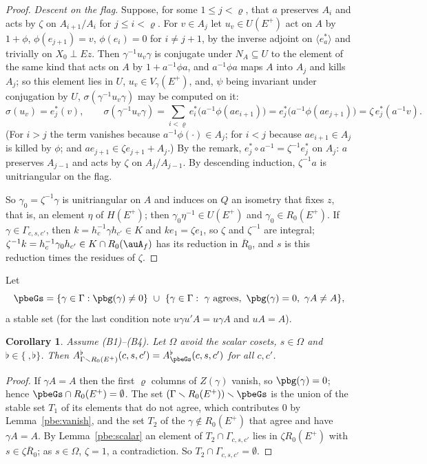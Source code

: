 \documentclass[10pt]{amsart}
\newtheorem{corollary}[theorem]{Corollary}
\theoremstyle{definition}
\theoremstyle{remark}
\providecommand{\pbR}{\overline R_0}
\begin{document}
\begin{proof}
\emph{Descent on the flag.} Suppose, for some $1\le j<\varrho$, that $a$ preserves $A_i$ and acts
by $\zeta$ on $A_{i+1}/A_i$ for $j\le i<\varrho$. For $v\in A_j$ let $u_v\in U(E^+)$ act on $A$ by
$1+\phi$, $\phi(e_{j+1})=v$, $\phi(e_i)=0$ for $i\ne j+1$, by the inverse adjoint on $\langle
e_a^*\rangle$ and trivially on $X_0\perp Ez$. Then $\gamma^{-1}u_v\gamma$ is conjugate under $N_A
\subseteq U$ to the element of the same kind that acts on $A$ by $1+a^{-1}\phi a$, and $a^{-1}\phi a$
maps $A$ into $A_j$ and kills $A_j$; so this element lies in $U$, $u_v\in V_\gamma(E^+)$, and, $\psi$
being invariant under conjugation by $U$, $\sigma(\gamma^{-1}u_v\gamma)$ may be computed on it:
\[
\sigma(u_v)=e_j^*(v),\qquad\sigma(\gamma^{-1}u_v\gamma)=\sum_{i<\varrho}e_i^*\bigl(a^{-1}\phi(ae_{i+1})
\bigr)=e_j^*\bigl(a^{-1}\phi(ae_{j+1})\bigr)=\zeta\,e_j^*(a^{-1}v).
\]
(For $i>j$ the term vanishes because $a^{-1}\phi(\cdot)\in A_j$; for $i<j$ because $ae_{i+1}\in A_j$
is killed by $\phi$; and $ae_{j+1}\in\zeta e_{j+1}+A_j$.) By the remark, $e_j^*\circ a^{-1}=\zeta^{-1}
e_j^*$ on $A_j$: $a$ preserves $A_{j-1}$ and acts by $\zeta$ on $A_j/A_{j-1}$. By descending
induction, $\zeta^{-1}a$ is unitriangular on the flag.

So $\gamma_0=\zeta^{-1}\gamma$ is unitriangular on $A$ and induces on $Q$ an isometry that fixes
$z$, that is, an element $\eta$ of $H(E^+)$; then $\gamma_0\eta^{-1}\in U(E^+)$ and $\gamma_0\in
R_0(E^+)$. If $\gamma\in\Gamma_{c,s,c'}$, then $k=h_c^{-1}\gamma h_{c'}\in K$ and $ke_1=\zeta e_1$, so
$\zeta$ and $\zeta^{-1}$ are integral; $\zeta^{-1}k=h_c^{-1}\gamma_0h_{c'}\in K\cap R_0(\auA_f)$ has
its reduction in $\pbR$, and $s$ is this reduction times the residues of $\zeta$.
\end{proof}

Let
\[
\pbeGs=\{\gamma\in\Gamma:\pbg(\gamma)\ne0\}\ \cup\ \{\gamma\in\Gamma:\ \gamma\text{ agrees},\ \pbg(
\gamma)=0,\ \gamma A\ne A\},
\]
a stable set (for the last condition note $u\gamma u'A=u\gamma A$ and $uA=A$).

\begin{corollary}\label{pbe:star}
Assume \textup{(B1)--(B4)}. Let $\Omega$ avoid the scalar cosets, $s\in\Omega$ and $\flat\in\{\ ,
\flat\}$. Then $A^\flat_{\Gamma\smallsetminus R_0(E^+)}(c,s,c')=A^\flat_{\pbeGs}(c,s,c')$ for all
$c,c'$.
\end{corollary}
\begin{proof}
If $\gamma A=A$ then the first $\varrho$ columns of $Z(\gamma)$ vanish, so $\pbg(\gamma)=0$; hence
$\pbeGs\cap R_0(E^+)=\emptyset$. The set $(\Gamma\smallsetminus R_0(E^+))\smallsetminus\pbeGs$ is the
union of the stable set $T_1$ of its elements that do not agree, which contributes $0$ by
Lemma~\ref{pbe:vanish}, and the set $T_2$ of the $\gamma\notin R_0(E^+)$ that agree and have
$\gamma A=A$. By Lemma~\ref{pbe:scalar} an element of $T_2\cap\Gamma_{c,s,c'}$ lies in $\zeta R_0(E^+)$
with $s\in\zeta\pbR$; as $s\in\Omega$, $\zeta=1$, a contradiction. So $T_2\cap\Gamma_{c,s,c'}=\emptyset$.
\end{proof}
\end{document}
